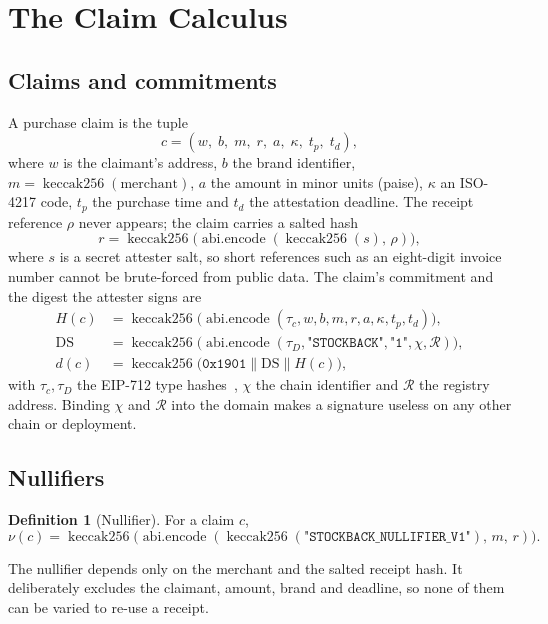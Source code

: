 \documentclass[10.5pt,letterpaper]{article}
\theoremstyle{definition}
\newtheorem{definition}{Definition}
\theoremstyle{remark}
\newcommand{\cat}{\mathbin{\|}}
\newcommand{\kk}{\operatorname{keccak256}}
\newcommand{\enc}{\operatorname{abi.encode}}
\begin{document}
\section{The Claim Calculus}\label{sec:calculus}

\subsection{Claims and commitments}
A purchase claim is the tuple
\begin{equation}
c = (w,\; b,\; m,\; r,\; a,\; \kappa,\; t_p,\; t_d),
\end{equation}
where $w$ is the claimant's address, $b$ the brand identifier, $m=\kk(\text{merchant})$, $a$ the amount in minor units
(paise), $\kappa$ an ISO-4217 code, $t_p$ the purchase time and $t_d$ the attestation deadline. The receipt reference
$\rho$ never appears; the claim carries a salted hash
\begin{equation}\label{eq:receipt}
r = \kk\!\big(\enc(\kk(s),\, \rho)\big),
\end{equation}
where $s$ is a secret attester salt, so short references such as an eight-digit invoice number cannot be
brute-forced from public data. The claim's commitment and the digest the attester signs are
\begin{align}
H(c) &= \kk\!\big(\enc(\tau_c, w, b, m, r, a, \kappa, t_p, t_d)\big),\\
\mathrm{DS} &= \kk\!\big(\enc(\tau_D, \texttt{"STOCKBACK"}, \texttt{"1"}, \chi, \mathcal R)\big),\\
d(c) &= \kk\!\big(\texttt{0x1901} \cat \mathrm{DS} \cat H(c)\big),\label{eq:digest}
\end{align}
with $\tau_c,\tau_D$ the EIP-712 type hashes~\cite{eip712}, $\chi$ the chain identifier and $\mathcal R$ the registry address.
Binding $\chi$ and $\mathcal R$ into the domain makes a signature useless on any other chain or deployment.

\subsection{Nullifiers}
\begin{definition}[Nullifier]
For a claim $c$,
\[ \nu(c) = \kk\!\big(\enc(\kk(\texttt{"STOCKBACK\_NULLIFIER\_V1"}),\, m,\, r)\big). \]
\end{definition}

The nullifier depends only on the merchant and the salted receipt hash. It deliberately excludes the claimant,
amount, brand and deadline, so none of them can be varied to re-use a receipt.
\end{document}

